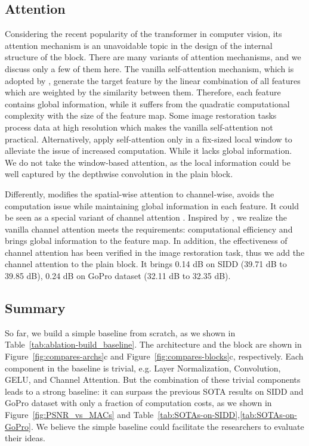 \documentclass[runningheads]{llncs}
\begin{document}
\subsection{Attention}
Considering the recent popularity of the transformer in computer vision, its attention mechanism is an unavoidable topic in the design of the internal structure of the block. 
There are many variants of attention mechanisms, and we discuss only a few of them here.
The vanilla self-attention mechanism\cite{vaswani2017attention}, which is adopted by \cite{dosovitskiy2020image,chen2021pre}, generate the target feature by the linear combination of all features which are weighted by the similarity between them. Therefore, each feature contains global information, while it suffers from the quadratic computational complexity with the size of the feature map.
Some image restoration tasks process data at high resolution which makes the vanilla self-attention not practical.
Alternatively, \cite{liu2021swin,liang2021swinir,wang2021uformer} apply self-attention only in a fix-sized local window to alleviate the issue of increased computation. While it lacks global information. We do not take the window-based attention, as the local information could be well captured by the depthwise convolution \cite{han2021demystifying,liu2022convnet} in the plain block. 

Differently, \cite{zamir2021restormer} modifies the spatial-wise attention to channel-wise, avoids the computation issue while maintaining global information in each feature. It could be seen as a special variant of channel attention \cite{hu2018squeeze}. Inspired by \cite{zamir2021restormer}, we realize the vanilla channel attention meets the requirements: computational efficiency and brings global information to the feature map. In addition, the effectiveness of channel attention has been verified in the image restoration task\cite{waqas2021multi,chu2021revisiting}, thus we add the channel attention to the plain block. It brings 0.14 dB on SIDD\cite{SIDD_2018_CVPR} (39.71 dB to 39.85 dB), 0.24 dB on GoPro\cite{nah2017deep} dataset (32.11 dB to 32.35 dB). 

\subsection{Summary}
So far, we build a simple baseline from scratch, as we shown in Table~\ref{tab:ablation-build_baseline}. The architecture and the block are shown in Figure~\ref{fig:compares-archs}c and Figure~\ref{fig:compares-blocks}c, respectively. 
Each component in the baseline is trivial, e.g. Layer Normalization, Convolution, GELU, and Channel Attention. But the combination of these trivial components leads to a strong baseline: it can surpass the previous SOTA results on SIDD and GoPro dataset with only a fraction of computation costs, as we shown in Figure~\ref{fig:PSNR_vs_MACs} and Table~\ref{tab:SOTAs-on-SIDD},\ref{tab:SOTAs-on-GoPro}.
We believe the simple baseline could facilitate the researchers to evaluate their ideas.
\end{document}
